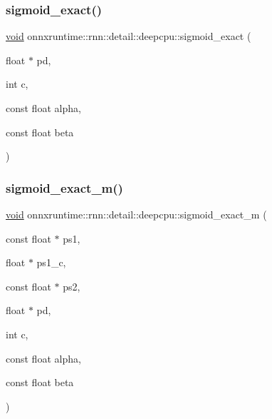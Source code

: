 \subsubsection{\texorpdfstring{sigmoid\+\_\+exact()}{sigmoid\_exact()}}
{\footnotesize\ttfamily \mbox{\hyperlink{mlasi_8h_a88f941d423cb2a819b70a1358982b1a6}{void}} onnxruntime\+::rnn\+::detail\+::deepcpu\+::sigmoid\+\_\+exact (\begin{DoxyParamCaption}\item[{float $\ast$}]{pd,  }\item[{int}]{c,  }\item[{const float}]{alpha,  }\item[{const float}]{beta }\end{DoxyParamCaption})}

\mbox{\label{namespaceonnxruntime_1_1rnn_1_1detail_1_1deepcpu_a6f774e13fe051815ea772646cbf8c1e4}} 
\subsubsection{\texorpdfstring{sigmoid\+\_\+exact\+\_\+m()}{sigmoid\_exact\_m()}}
{\footnotesize\ttfamily \mbox{\hyperlink{mlasi_8h_a88f941d423cb2a819b70a1358982b1a6}{void}} onnxruntime\+::rnn\+::detail\+::deepcpu\+::sigmoid\+\_\+exact\+\_\+m (\begin{DoxyParamCaption}\item[{const float $\ast$}]{ps1,  }\item[{float $\ast$}]{ps1\+\_\+c,  }\item[{const float $\ast$}]{ps2,  }\item[{float $\ast$}]{pd,  }\item[{int}]{c,  }\item[{const float}]{alpha,  }\item[{const float}]{beta }\end{DoxyParamCaption})}

\mbox{\label{namespaceonnxruntime_1_1rnn_1_1detail_1_1deepcpu_a1f8aaad863b8c54e1da63bc6e8973a59}} 
